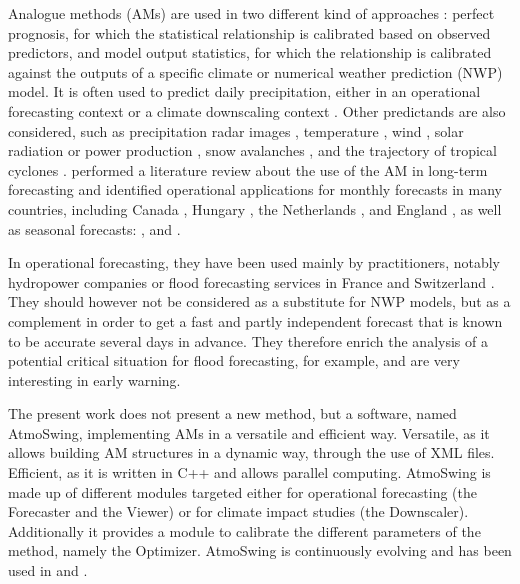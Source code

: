 \documentclass[review]{elsarticle}
\begin{document}
Analogue methods (AMs) are used in two different kind of approaches \citep{Rummukainen1997}: perfect prognosis, for which the statistical relationship is calibrated based on observed predictors, and model output statistics, for which the relationship is calibrated against the outputs of a specific climate or numerical weather prediction (NWP) model. It is often used to predict daily precipitation, either in an operational forecasting context \citep[e.g.][]{Guilbaud1997, Bontron2005, Hamill2006, Bliefernicht2010, Marty2012, Horton2012, Hamill2015, BenDaoud2016} or a climate downscaling context \citep[e.g.][]{Radanovics2013, Chardon2014, Dayon2015, Raynaud2016b}. Other predictands are also considered, such as precipitation radar images \citep{Panziera2011,Foresti2015a}, temperature \citep{Radinovic1975, Woodcock1980, Kruizinga1983, DelleMonache2013, Caillouet2016, Raynaud2016b}, wind \citep{Gordon1987, DelleMonache2013, DelleMonache2011, Vanvyve2015, Alessandrini2015, Junk2015, Junk2015c}, solar radiation or power production \citep{Alessandrini2015a, Bessa2015, Raynaud2016b}, snow avalanches \citep{Obled1980, Bolognesi1993}, and the trajectory of tropical cyclones \citep{Keenan1981, Sievers2000, Fraedrich2003}. \citet{Guilbaud1997} performed a literature review about the use of the AM in long-term forecasting and identified operational applications for monthly forecasts in many countries, including Canada \citep{Shabbar1986},  Hungary \citep{Toth1989}, the Netherlands \citep{Nap1981}, and England \citep{Murray1974}, as well as seasonal forecasts: \citet{Barnett1978}, \citet{Bergen1982} and \citet{Livezey1988}.

In operational forecasting, they have been used mainly by practitioners, notably hydropower companies \citep{Desaint2008a,BenDaoud2009,Obled2014} or flood forecasting services in France and Switzerland \citep{Marty2010,GarciaHernandez2009b,Horton2012}. They should however not be considered as a substitute for NWP models, but as a complement in order to get a fast and partly independent forecast that is known to be accurate several days in advance. They therefore enrich the analysis of a potential critical situation for flood forecasting, for example, and are very interesting in early warning.

The present work does not present a new method, but a software, named AtmoSwing, implementing AMs in a versatile and efficient way. Versatile, as it allows building AM structures in a dynamic way, through the use of XML files. Efficient, as it is written in C++ and allows parallel computing. AtmoSwing is made up of different modules targeted either for operational forecasting (the Forecaster and the Viewer) or for climate impact studies (the Downscaler). Additionally it provides a module to calibrate the different parameters of the method, namely the Optimizer. AtmoSwing is continuously evolving and has been used in \citet{Horton2012, Horton2017a, Horton2017b, Horton2018a} and \citet{Horton2018b}.
\end{document}
